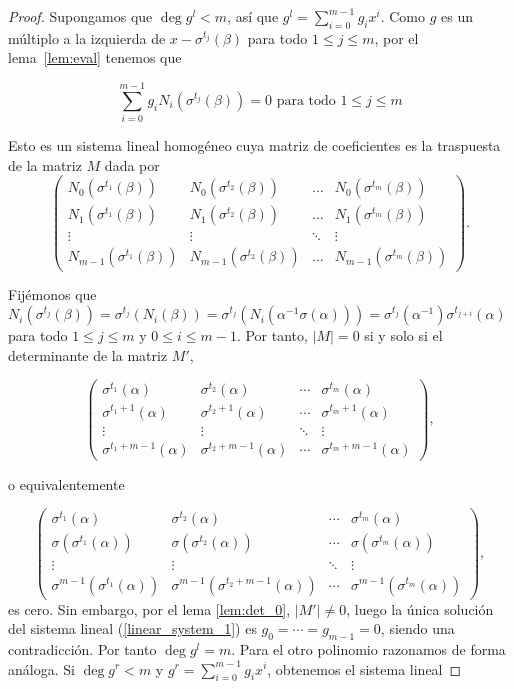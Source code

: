 \begin{proof}
    Supongamos que \(\deg g^l < m\), así que \(g^l = \sum_{i=0}^{m-1} g_i x^i\). Como \(g\) es un múltiplo a la izquierda de \(x - \sigma^{t_j}(\beta)\) para todo \(1 \leq j \leq m\), por el lema~\ref{lem:eval} tenemos que

\begin{equation}
\label{linear_system_1}
    \sum_{i=0}^{m-1}g_i N_i(\sigma^{t_j}(\beta)) = 0 \text{ para todo } 1 \leq j \leq m
\end{equation}

Esto es un sistema lineal homogéneo cuya matriz de coeficientes es la traspuesta de la matriz \(M\) dada por
\[
\begin{pmatrix}
    N_0(\sigma^{t_1}(\beta)) & N_0(\sigma^{t_2}(\beta)) & \dots & N_0(\sigma^{t_m}(\beta)) \\
    N_1(\sigma^{t_1}(\beta)) & N_1(\sigma^{t_2}(\beta)) & \dots & N_1(\sigma^{t_m}(\beta)) \\
    \vdots & \vdots & \ddots & \vdots \\
    N_{m-1}(\sigma^{t_1}(\beta)) & N_{m-1}(\sigma^{t_2}(\beta)) & \dots & N_{m-1}(\sigma^{t_m}(\beta))
\end{pmatrix}
.\]

Fijémonos que \(N_i(\sigma^{t_j}(\beta)) = \sigma^{t_j}(N_i(\beta)) = \sigma^{t_j}(N_i(\alpha^{-1}\sigma(\alpha))) = \sigma^{t_j}(\alpha^{-1}) \sigma^{t_{j+i}}(\alpha)\) para todo \(1 \leq j \leq m\) y \(0 \leq i \leq m-1\). Por tanto,  \(|M| = 0\) si y solo si el determinante de la matriz \(M'\),

\[
\begin{pmatrix}
    \sigma^{t_1}(\alpha) & \sigma^{t_2}(\alpha) & \cdots & \sigma^{t_m}(\alpha) \\
    \sigma^{t_1+1}(\alpha) & \sigma^{t_2+1}(\alpha) & \cdots & \sigma^{t_m+1}(\alpha) \\
    \vdots & \vdots & \ddots & \vdots \\
    \sigma^{t_1 + m-1}(\alpha) & \sigma^{t_2+m-1}(\alpha) & \cdots & \sigma^{t_m+m-1}(\alpha)
\end{pmatrix}
,\]

o equivalentemente

\[
\begin{pmatrix}
    \sigma^{t_1}(\alpha) & \sigma^{t_2}(\alpha) & \cdots & \sigma^{t_m}(\alpha) \\
    \sigma(\sigma^{t_1}(\alpha)) & \sigma(\sigma^{t_2}(\alpha)) & \cdots & \sigma(\sigma^{t_m}(\alpha)) \\
    \vdots & \vdots & \ddots & \vdots \\
    \sigma^{m-1}(\sigma^{t_1}(\alpha)) & \sigma^{m-1}(\sigma^{t_2+m-1}(\alpha)) & \cdots & \sigma^{m-1}(\sigma^{t_m}(\alpha))
\end{pmatrix}
,\]
es cero. Sin embargo, por el lema \ref{lem:det_0}, \(|M'| \neq 0\), luego la única solución del sistema lineal (\ref{linear_system_1}) es \(g_0 = \cdots = g_{m-1} = 0\), siendo una contradicción. Por tanto \(\deg g^l = m\). Para el otro polinomio razonamos de forma análoga. Si \(\deg g^r < m\) y \(g^r = \sum_{i=0}^{m-1}g_ix^i\), obtenemos el sistema lineal


\end{proof}
